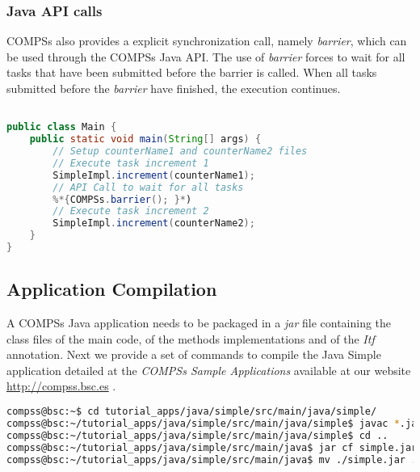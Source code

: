 \subsubsection{Java API calls}

COMPSs also provides a explicit synchronization call, namely \textit{barrier}, which can be used through the COMPSs Java API.
The use of \textit{barrier} forces to wait for all tasks that have been submitted before the barrier is called.
When all tasks submitted before the \textit{barrier} have finished, the execution continues.

\begin{lstlisting}[language=java]
%*{\bf import es.bsc.compss.api.COMPSs;}*)

public class Main {
    public static void main(String[] args) {
        // Setup counterName1 and counterName2 files
        // Execute task increment 1
        SimpleImpl.increment(counterName1);
        // API Call to wait for all tasks
        %*{COMPSs.barrier(); }*)
        // Execute task increment 2
        SimpleImpl.increment(counterName2);
    }
}
\end{lstlisting}



\subsection{Application Compilation}
A COMPSs Java application needs to be packaged in a \textit{jar} file containing the class files of the main code, of the methods implementations and of the \textit{Itf} annotation.
Next we provide a set of commands to compile the Java Simple application detailed at the \textit{COMPSs Sample Applications} 
available at our website \url{http://compss.bsc.es} .
\begin{lstlisting}[language=bash]
compss@bsc:~$ cd tutorial_apps/java/simple/src/main/java/simple/
compss@bsc:~/tutorial_apps/java/simple/src/main/java/simple$ javac *.java
compss@bsc:~/tutorial_apps/java/simple/src/main/java/simple$ cd ..
compss@bsc:~/tutorial_apps/java/simple/src/main/java$ jar cf simple.jar simple/
compss@bsc:~/tutorial_apps/java/simple/src/main/java$ mv ./simple.jar ../../../jar/
\end{lstlisting}

